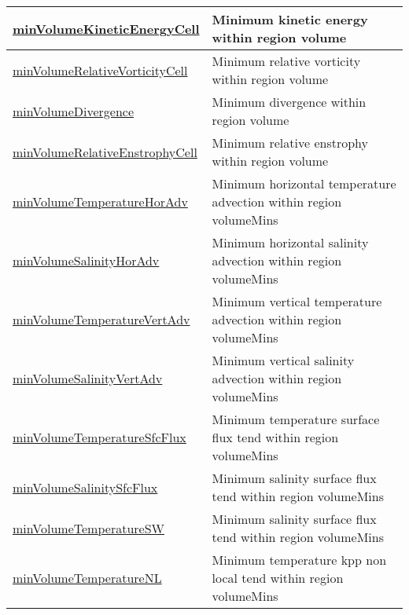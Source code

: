 {\begin{center}
\begin{longtable}{| p{2.0in} | p{4.0in} |}
    \hline
    \hyperref[subsec:var_sec_layerVolumeWeightedAverageAM_minVolumeKineticEnergyCell]{minVolumeKineticEnergyCell} & Minimum kinetic energy within region volume \\
    \hline
    \hyperref[subsec:var_sec_layerVolumeWeightedAverageAM_minVolumeRelativeVorticityCell]{minVolumeRelativeVorticityCell} & Minimum relative vorticity within region volume \\
    \hline
    \hyperref[subsec:var_sec_layerVolumeWeightedAverageAM_minVolumeDivergence]{minVolumeDivergence} & Minimum divergence within region volume \\
    \hline
    \hyperref[subsec:var_sec_layerVolumeWeightedAverageAM_minVolumeRelativeEnstrophyCell]{minVolumeRelativeEnstrophyCell} & Minimum relative enstrophy within region volume \\
    \hline
    \hyperref[subsec:var_sec_layerVolumeWeightedAverageAM_minVolumeTemperatureHorAdv]{minVolumeTemperatureHorAdv} & Minimum horizontal temperature advection within region volumeMins \\
    \hline
    \hyperref[subsec:var_sec_layerVolumeWeightedAverageAM_minVolumeSalinityHorAdv]{minVolumeSalinityHorAdv} & Minimum horizontal salinity advection within region volumeMins \\
    \hline
    \hyperref[subsec:var_sec_layerVolumeWeightedAverageAM_minVolumeTemperatureVertAdv]{minVolumeTemperatureVertAdv} & Minimum vertical temperature advection within region volumeMins \\
    \hline
    \hyperref[subsec:var_sec_layerVolumeWeightedAverageAM_minVolumeSalinityVertAdv]{minVolumeSalinityVertAdv} & Minimum vertical salinity advection within region volumeMins \\
    \hline
    \hyperref[subsec:var_sec_layerVolumeWeightedAverageAM_minVolumeTemperatureSfcFlux]{minVolumeTemperatureSfcFlux} & Minimum temperature surface flux tend within region volumeMins \\
    \hline
    \hyperref[subsec:var_sec_layerVolumeWeightedAverageAM_minVolumeSalinitySfcFlux]{minVolumeSalinitySfcFlux} & Minimum salinity surface flux tend within region volumeMins \\
    \hline
    \hyperref[subsec:var_sec_layerVolumeWeightedAverageAM_minVolumeTemperatureSW]{minVolumeTemperatureSW} & Minimum salinity surface flux tend within region volumeMins \\
    \hline
    \hyperref[subsec:var_sec_layerVolumeWeightedAverageAM_minVolumeTemperatureNL]{minVolumeTemperatureNL} & Minimum temperature kpp non local tend within region volumeMins \\

\end{longtable}
\end{center}}
